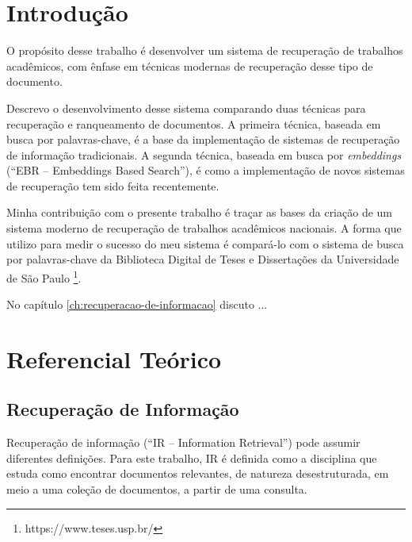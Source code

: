 \documentclass[
	12pt,				%
	openright,			%
	oneside,			%
	a4paper,			%
	english,			%
	french,				%
	spanish,			%
	brazil				%
	]{abntex2}
\begin{document}
\textual

\chapter*[Introdução]{Introdução}
\label{chap:intro}




O propósito desse trabalho é desenvolver um sistema de recuperação de trabalhos acadêmicos, com ênfase em técnicas modernas
de recuperação desse tipo de documento.

Descrevo o desenvolvimento desse sistema comparando duas técnicas para recuperação e ranqueamento de documentos.
A primeira técnica, baseada em busca por palavras-chave, é a base da implementação de sistemas de recuperação de informação tradicionais.
A segunda técnica, baseada em busca por \textit{embeddings} (``EBR -- Embeddings Based Search''), é como a implementação de novos sistemas de recuperação
tem sido feita recentemente.

Minha contribuição com o presente trabalho é traçar as bases da criação de um sistema moderno de recuperação de trabalhos acadêmicos nacionais.
A forma que utilizo para medir o sucesso do meu sistema é compará-lo com o sistema de busca por palavras-chave da Biblioteca Digital
de Teses e Dissertações da Universidade de São Paulo \footnote{https://www.teses.usp.br/}.

No capítulo \ref{ch:recuperacao-de-informacao} discuto ...


\chapter{Referencial Teórico}\label{ch:sistemas-de-recuperacao-de-informacao}

\section{Recuperação de Informação}\label{sec:sobre-recuperacao-de-informacao}

Recuperação de informação (``IR -- Information Retrieval'') pode assumir diferentes definições.
Para este trabalho, IR é definida como a disciplina que estuda como encontrar documentos relevantes, de natureza desestruturada, em meio a uma coleção de documentos, a
partir de uma consulta. \cite{manning2008introduction}
\end{document}
